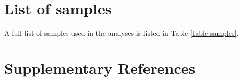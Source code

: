 \documentclass[a4paper, 12pt]{article}
\begin{document}
\newpage
\section{List of samples}

A full list of samples used in the analyses is listed in Table \ref{table-samples}.



\newpage
\section{Supplementary References}
 


\end{document}

